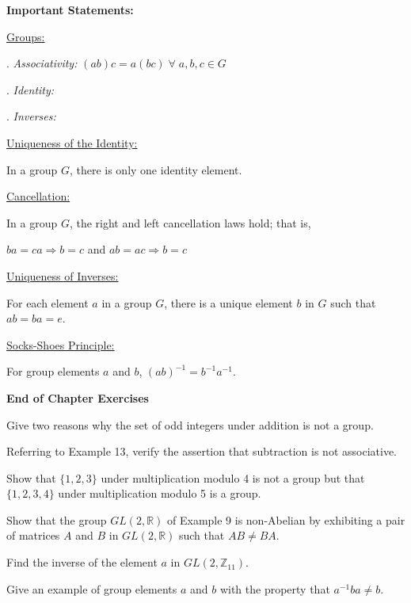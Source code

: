 \documentclass[11pt,largemargins]{homework}
\begin{document}
\maketitle

\textbf{\large{Important Statements:}}

\underline{Groups:}

. \textit{Associativity:} $(ab)c=a(bc) \;\forall\;a,b,c \in G$

. \textit{Identity:} 

. \textit{Inverses:}

\underline{Uniqueness of the Identity:}

\quad In a group $G$, there is only one identity element.

\underline{Cancellation:}

\quad In a group $G$, the right and left cancellation laws hold; that is, 

\quad $ba=ca \Rightarrow b=c$ and $ab=ac \Rightarrow b=c$

\underline{Uniqueness of Inverses:}

\quad For each element $a$ in a group $G$, there is a unique element $b$ in $G$ such that $ab=ba=e$.

\underline{Socks-Shoes Principle:}

\quad For group elements $a$ and $b$, $(ab)^{-1}=b^{-1}a^{-1}$.

\hfill

\textbf{\large{End of Chapter Exercises}}

\question
Give two reasons why the set of odd integers under addition is not a group.

\question
Referring to Example 13, verify the assertion that subtraction is not associative.


\question
Show that $\{1, 2, 3\}$ under multiplication modulo 4 is not a group but that $\{1,2,3,4\}$ under multiplication 
modulo 5 is a group.

\question
Show that the group $GL(2, \mathbb{R})$ of Example 9 is non-Abelian by exhibiting a pair of matrices $A$ and $B$ 
in $GL(2, \mathbb{R})$ such that $AB \neq BA$.


\question
Find the inverse of the element $a$ in $GL(2, \mathbb{Z}_{11})$.


\question
Give an example of group elements $a$ and $b$ with the property that $a^{-1}ba\neq b$.
\end{document}
